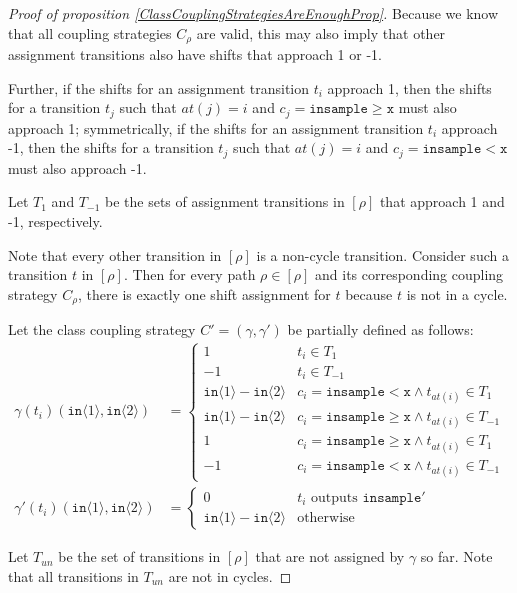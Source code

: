 \documentclass[12pt]{article}
\newcommand{\gguard}[1][x]{\texttt{insample}\geq#1}
\newcommand{\lguard}[1][x]{\texttt{insample} < #1}
\newcommand{\brangle}[1]{\langle#1 \rangle}
\theoremstyle{definition}
\begin{document}
\begin{proof}[Proof of proposition \ref{ClassCouplingStrategiesAreEnoughProp}]
    Because we know that all coupling strategies $C_{\rho}$ are valid, this may also imply that other assignment transitions also have shifts that approach 1 or -1. 

    Further, if the shifts for an assignment transition $t_i$ approach 1, then the shifts for a transition $t_j$ such that $at(j) = i$ and $c_j = \gguard[\texttt{x}]$ must also approach 1; symmetrically, if the shifts for an assignment transition $t_i$ approach -1, then the shifts for a transition $t_j$ such that $at(j) = i$ and $c_j = \lguard[\texttt{x}]$ must also approach -1. 

    Let $T_1$ and $T_{-1}$ be the sets of assignment transitions in $[\rho]$ that approach 1 and -1, respectively. 

    Note that every other transition in $[\rho]$ is a non-cycle transition. Consider such a transition $t$ in $[\rho]$. Then for every path $\rho\in [\rho]$ and its corresponding coupling strategy $C_\rho$, there is exactly one shift assignment for $t$ because $t$ is not in a cycle. 

    Let the class coupling strategy $C' = (\gamma, \gamma')$ be partially defined as follows: \begin{align*}
        \gamma(t_i)(\texttt{in}\brangle{1}, \texttt{in}\brangle{2}) &= \begin{cases}
            1 & t_i \in T_1\\
            -1 & t_i \in T_{-1}\\
            \texttt{in}\brangle{1}-\texttt{in}\brangle{2} & c_i = \lguard[\texttt{x}]\land t_{at(i)}\in T_1\\
            \texttt{in}\brangle{1}-\texttt{in}\brangle{2} & c_i = \gguard[\texttt{x}]\land t_{at(i)}\in T_{-1}\\
            1 & c_i = \gguard[\texttt{x}]\land t_{at(i)}\in T_1\\
            -1 & c_i = \lguard[\texttt{x}]\land t_{at(i)}\in T_{-1}
        \end{cases}\\
        \gamma'(t_i)(\texttt{in}\brangle{1}, \texttt{in}\brangle{2}) &=\begin{cases}
            0 & t_i\text{ outputs }\texttt{insample}'\\
            \texttt{in}\brangle{1}-\texttt{in}\brangle{2} & \text{otherwise}
        \end{cases}
    \end{align*}

    Let $T_{un}$ be the set of transitions in $[\rho]$ that are not assigned by $\gamma$ so far. Note that all transitions in $T_{un}$ are not in cycles. 


\end{proof}
\end{document}
